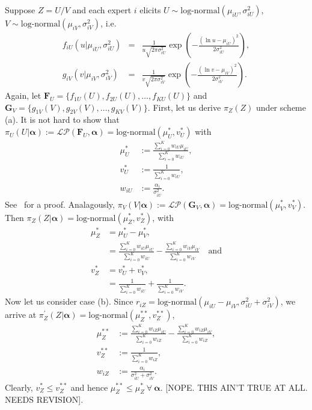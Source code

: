 \documentclass[a4paper, notitlepage, 10pt]{article}
\begin{document}
Suppose $Z = U/V$ and each expert $i$ elicits $U \sim \text{log-normal}(\mu_{iU}, \sigma_{iU}^2)$, $V \sim \text{log-normal}(\mu_{iV}, \sigma_{iV}^2)$, i.e.
\begin{eqnarray*}
\nonumber
f_{iU}(u | \mu_{iU}, \sigma_{iU}^2) &=& \frac{1}{u \sqrt{2\pi\sigma_{iU}^2}} \exp\left( - \frac{ \left( \ln u - \mu_{iU} \right)^2 }{2 \sigma_{iU}^2} \right), \\
g_{iV}(v | \mu_{iV}, \sigma_{iV}^2) &=& \frac{1}{v \sqrt{2\pi\sigma_{iV}^2}} \exp\left( - \frac{ \left( \ln v - \mu_{iV} \right)^2 }{2 \sigma_{iV}^2} \right).
\end{eqnarray*}
Again, let $\mathbf{F}_U = \{f_{1U}(U), f_{2U}(U), \ldots, f_{KU}(U) \}$ and $\mathbf{G}_V = \{g_{1V}(V), g_{2V}(V), \ldots, g_{KV}(V) \}$.
First, let us derive $\pi_Z(Z)$ under scheme (a).
It is not hard to show that  $\pi_U(U | \boldsymbol\alpha) := \mathcal{LP}(\mathbf{F}_{U}, \boldsymbol \alpha) =  \text{log-normal}(\mu_U^\ast, v_U^\ast)$ with
\begin{align}
 \mu_U^\ast &:= \frac{\sum_{i=0}^K w_{iU} \mu_{iU}}{\sum_{i=0}^K w_{iU}}, \\
 v_U^\ast &:= \frac{1}{\sum_{i=0}^K w_{iU} }, \\
 w_{iU} &:=  \frac{\alpha_i}{\sigma_{iU}^2}.
\end{align}
See~\cite{Carvalho2019} for a proof.
Analagously, $\pi_V(V | \boldsymbol\alpha) := \mathcal{LP}(\mathbf{G}_{V}, \boldsymbol \alpha) =  \text{log-normal}(\mu_V^\ast, v_V^\ast)$.
Then $\pi_Z(Z |  \boldsymbol \alpha) = \text{log-normal}(\mu_Z^{\ast}, v_Z^{\ast})$, with
\begin{align}
\nonumber
 \mu_Z^{\ast} &= \mu_U^\ast - \mu_V^\ast,\\
 &= \frac{\sum_{i=0}^K w_{iU} \mu_{iU}}{\sum_{i=0}^K w_{iU}} - \frac{\sum_{i=0}^K w_{iV} \mu_{iV}}{\sum_{i=0}^K w_{iV}}\quad \text{and} \\
 \nonumber
v_Z^{\ast} &= v_U^\ast + v_V^\ast, \\
&= \frac{1}{\sum_{i=0}^K w_{iU} } + \frac{1}{\sum_{i=0}^K w_{iV} }.
\end{align}
Now let us consider case (b).
Since $r_{iZ} = \text{log-normal}(\mu_{iU} - \mu_{iV}, \sigma_{iU}^2 +  \sigma_{iV}^2)$, we arrive at  $\pi_Z^{\prime}(Z |  \boldsymbol \alpha) = \text{log-normal}(\mu_Z^{\ast\ast}, v_Z^{\ast\ast})$,
\begin{align}
 \mu_Z^{\ast\ast} &:= \frac{\sum_{i=0}^K w_{iZ} \mu_{iU}}{\sum_{i=0}^K w_{iZ}} - \frac{\sum_{i=0}^K w_{iZ} \mu_{iV}}{\sum_{i=0}^K w_{iZ}}, \\
 v_Z^{\ast\ast} &:= \frac{1}{\sum_{i=0}^K w_{iZ} }, \\
 w_{iZ} &:=  \frac{\alpha_i}{\sigma_{iU}^2 + \sigma_{iV}^2}.
\end{align}
Clearly, $v_Z^{\ast} \leq v_Z^{\ast\ast}$ and hence $\mu_Z^{\ast\ast} \leq \mu_Z^{\ast} \: \forall \: \boldsymbol\alpha$. [NOPE. THIS AIN'T TRUE AT ALL. NEEDS REVISION].
\end{document}
